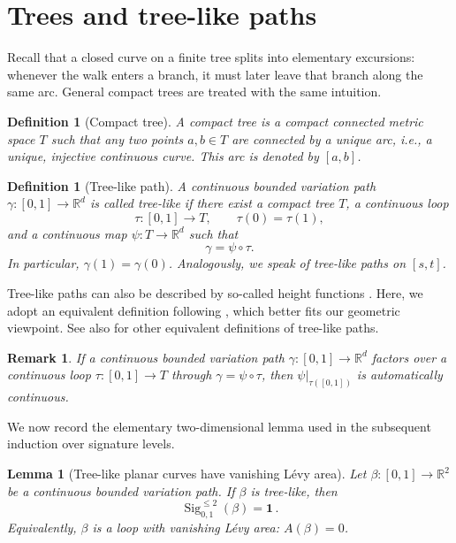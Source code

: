 \documentclass[10pt,a4paper]{amsart}
\newtheorem{lemma}[theorem]{Lemma}
\newtheorem{definition}[theorem]{Definition}
\newtheorem{remark}[theorem]{Remark}
\newcommand{\R}{\mathbb{R}}
\newcommand{\Sig}{\operatorname{Sig}}
\newcommand{\id}{\mathbf{1}}
\begin{document}
\section{Trees and tree-like paths}\label{sec:tree-like}

Recall that a closed curve on a finite tree splits into elementary excursions: whenever the walk enters a branch, it must later leave that branch along the same arc. General compact trees are treated with the same intuition. 

\begin{definition}[Compact tree]
A compact tree is a compact connected metric space $T$ such that any two points $a,b\in T$ are connected by a unique arc, i.e., a unique, injective continuous curve. This arc is denoted by $[a,b]$.
\end{definition}


\begin{definition}[Tree-like path]
A continuous bounded variation path $ \gamma:[0,1]\to\R^d $ is called tree-like if there exist a compact tree $ T $, a continuous loop
\[
  \tau:[0,1]\to T,
  \qquad \tau(0)=\tau(1),
\]
and a continuous map $ \psi:T\to\R^d $ such that
\[
  \gamma=\psi\circ\tau.
\]
In particular, $ \gamma(1)=\gamma(0) $. Analogously, we speak of tree-like paths on $[s,t]$.
\end{definition}

Tree-like paths can also be described by so-called height functions \cite{HL2010}. Here, we adopt an equivalent definition following \cite{BGLY2016}, which better fits our geometric viewpoint. See also \cite[Theorem 5.15]{L2017} for other equivalent definitions of tree-like paths.


\begin{remark}\label{openmap}
If a continuous bounded variation path $ \gamma:[0,1]\to\R^d $ factors over a continuous loop $ \tau:[0,1] \to T$ through $ \gamma= \psi \circ \tau$, then $\psi|_{\tau([0,1])}$ is automatically continuous.
\end{remark}

We now record the elementary two-dimensional lemma used in the subsequent induction over signature levels.

\begin{lemma}[Tree-like planar curves have vanishing Lévy area]\label{lem:2DTreeLikeLemma}
Let $\beta:[0,1]\to\R^2$ be a continuous bounded variation path. If $\beta$ is tree-like, then
\[
  \Sig^{\leq 2}_{0,1}(\beta)=\id \, .
\]
Equivalently, $\beta$ is a loop  with vanishing Lévy area: $A(\beta) = 0$. 
\end{lemma}
\end{document}
